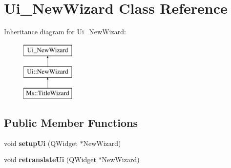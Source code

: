\hypertarget{class_ui___new_wizard}{}\section{Ui\+\_\+\+New\+Wizard Class Reference}
\label{class_ui___new_wizard}
Inheritance diagram for Ui\+\_\+\+New\+Wizard\+:\begin{figure}[H]
\begin{center}
\leavevmode
\includegraphics[height=3.000000cm]{class_ui___new_wizard}
\end{center}
\end{figure}
\subsection*{Public Member Functions}
\begin{DoxyCompactItemize}
\item 
\mbox{\label{class_ui___new_wizard_aa8f7557d4bc5e79f36f0162a2cbab182}} 
void {\bfseries setup\+Ui} (Q\+Widget $\ast$New\+Wizard)
\item 
\mbox{\label{class_ui___new_wizard_a2d2860e6e15b0a1c87aa082db32a303d}} 
void {\bfseries retranslate\+Ui} (Q\+Widget $\ast$New\+Wizard)
\end{DoxyCompactItemize}
